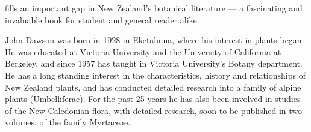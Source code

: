  fills an important gap in New Zealand's botanical literature — a fascinating and invaluable book for student and general reader alike.

John Dawson was born in 1928 in Eketahuna, where his interest in plants began.
He was educated at Victoria University and the University of California at Berkeley, and since 1957 has taught in Victoria University's Botany department.
He has a long standing interest in the characteristics, history and relationships of New Zealand plants, and has conducted detailed research into a family of alpine plants (Umbelliferae).
For the past 25 years he has also been involved in studies of the New Caledonian flora, with detailed research, soon to be published in two volumes, of the family Myrtaceae.

